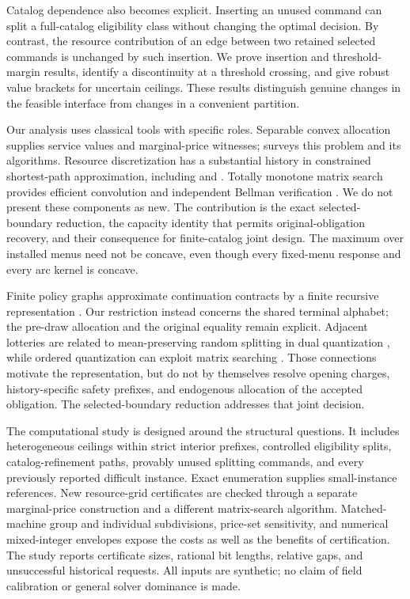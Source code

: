 Catalog dependence also becomes explicit. Inserting an unused command can split a full-catalog eligibility class without changing the optimal decision. By contrast, the resource contribution of an edge between two retained selected commands is unchanged by such insertion. We prove insertion and threshold-margin results, identify a discontinuity at a threshold crossing, and give robust value brackets for uncertain ceilings. These results distinguish genuine changes in the feasible interface from changes in a convenient partition.

Our analysis uses classical tools with specific roles. Separable convex allocation supplies service values and marginal-price witnesses; \citet{Patriksson2008} surveys this problem and its algorithms. Resource discretization has a substantial history in constrained shortest-path approximation, including \citet{Hassin1992} and \citet{LorenzRaz2001}. Totally monotone matrix search provides efficient convolution and independent Bellman verification \citep{Aggarwal1987}. We do not present these components as new. The contribution is the exact selected-boundary reduction, the capacity identity that permits original-obligation recovery, and their consequence for finite-catalog joint design. The maximum over installed menus need not be concave, even though every fixed-menu response and every arc kernel is concave.

Finite policy graphs approximate continuation contracts by a finite recursive representation \citep{Zhang2012}. Our restriction instead concerns the shared terminal alphabet; the pre-draw allocation and the original equality remain explicit. Adjacent lotteries are related to mean-preserving random splitting in dual quantization \citep{PagesWilbertz2012}, while ordered quantization can exploit matrix searching \citep{Wu1991}. Those connections motivate the representation, but do not by themselves resolve opening charges, history-specific safety prefixes, and endogenous allocation of the accepted obligation. The selected-boundary reduction addresses that joint decision.

The computational study is designed around the structural questions. It includes heterogeneous ceilings within strict interior prefixes, controlled eligibility splits, catalog-refinement paths, provably unused splitting commands, and every previously reported difficult instance. Exact enumeration supplies small-instance references. New resource-grid certificates are checked through a separate marginal-price construction and a different matrix-search algorithm. Matched-machine group and individual subdivisions, price-set sensitivity, and numerical mixed-integer envelopes expose the costs as well as the benefits of certification. The study reports certificate sizes, rational bit lengths, relative gaps, and unsuccessful historical requests. All inputs are synthetic; no claim of field calibration or general solver dominance is made.

